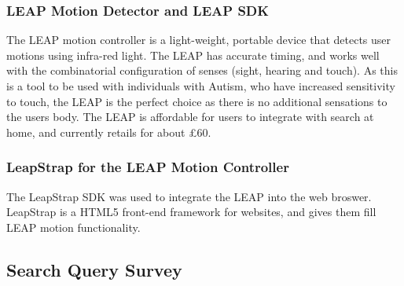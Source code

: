 \documentclass[a4paper, 11pt]{article}
\begin{document}
\subsubsection{LEAP Motion Detector and LEAP SDK}
The LEAP motion controller is a light-weight, portable device that detects user motions using infra-red light. The LEAP has accurate timing, and works well with the combinatorial configuration of senses (sight, hearing and touch). As this is a tool to be used with individuals with Autism, who have increased sensitivity to touch, the LEAP is the perfect choice as there is no additional sensations to the users body. The LEAP is affordable for users to integrate with search at home, and currently retails for about \pounds60.


\subsubsection{LeapStrap for the LEAP Motion Controller}
The LeapStrap SDK was used to integrate the LEAP into the web broswer. LeapStrap is a HTML5 front-end framework for websites, and gives them fill LEAP motion functionality. 


\newpage
\subsection{Search Query Survey} \label{AppendixA}
\end{document}
